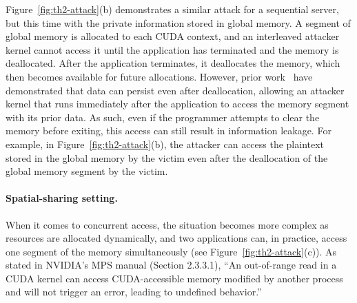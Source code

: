 Figure~\ref{fig:th2-attack}(b) demonstrates a similar attack for a sequential server, but this time with the private information stored in global memory.
%
A segment of global memory is allocated to each CUDA context,  and an interleaved attacker kernel cannot access it until the application has terminated and the memory is deallocated.
%
After the application terminates, it deallocates the memory,  which then becomes available for future allocations.
%
However, prior work~\cite{pietro2016TECS} have demonstrated that data can persist even after deallocation, allowing an attacker kernel that runs immediately after the application to access the memory segment with its prior data. 
%
As such, even if the programmer attempts to clear the memory before exiting, this access can still result in information leakage. 
%
For example, in Figure~\ref{fig:th2-attack}(b), the attacker can access the plaintext stored in the global memory by the victim even after the deallocation of the global memory segment by the victim.

\paragraph{Spatial-sharing setting.}

When it comes to concurrent access, the situation becomes more complex as resources are allocated dynamically, and two applications can, in practice, access one segment of the memory simultaneously (see Figure~\ref{fig:th2-attack}(c)).
%
As stated in NVIDIA's MPS manual (Section 2.3.3.1), ``An out-of-range read in a CUDA kernel can access CUDA-accessible memory modified by another process and will not trigger an error, leading to undefined behavior.'' \cite{hayes2017usenix}



% 
% 
%

